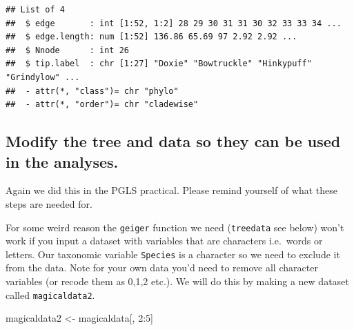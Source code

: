 \documentclass[]{book}
\newenvironment{Shaded}{\begin{snugshade}}{\end{snugshade}}
\newcommand{\KeywordTok}[1]{\textcolor[rgb]{0.13,0.29,0.53}{\textbf{{#1}}}}
\newcommand{\DecValTok}[1]{\textcolor[rgb]{0.00,0.00,0.81}{{#1}}}
\newcommand{\StringTok}[1]{\textcolor[rgb]{0.31,0.60,0.02}{{#1}}}
\newcommand{\CommentTok}[1]{\textcolor[rgb]{0.56,0.35,0.01}{\textit{{#1}}}}
\newcommand{\NormalTok}[1]{{#1}}
\begin{document}
\begin{verbatim}
## List of 4
##  $ edge       : int [1:52, 1:2] 28 29 30 31 31 30 32 33 33 34 ...
##  $ edge.length: num [1:52] 136.86 65.69 97 2.92 2.92 ...
##  $ Nnode      : int 26
##  $ tip.label  : chr [1:27] "Doxie" "Bowtruckle" "Hinkypuff" "Grindylow" ...
##  - attr(*, "class")= chr "phylo"
##  - attr(*, "order")= chr "cladewise"
\end{verbatim}

\subsection{Modify the tree and data so they can be used in the
analyses.}\label{modify-the-tree-and-data-so-they-can-be-used-in-the-analyses.}

Again we did this in the PGLS practical. Please remind yourself of what
these steps are needed for.

\begin{Shaded}
\end{Shaded}

For some weird reason the \texttt{geiger} function we need
(\texttt{treedata} see below) won't work if you input a dataset with
variables that are characters i.e.~words or letters. Our taxonomic
variable \texttt{Species} is a character so we need to exclude it from
the data. Note for your own data you'd need to remove all character
variables (or recode them as 0,1,2 etc.). We will do this by making a
new dataset called \texttt{magicaldata2}.

\begin{Shaded}
\begin{Highlighting}[]
\NormalTok{magicaldata2 <-}\StringTok{ }\NormalTok{magicaldata[, }\DecValTok{2}\NormalTok{:}\DecValTok{5}\NormalTok{]}
\end{Highlighting}
\end{Shaded}
\end{document}
